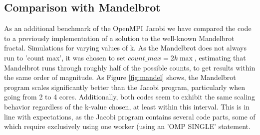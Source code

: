 \documentclass{article}
\begin{document}
\subsection{Comparison with Mandelbrot}
As an additional benchmark of the OpenMPI Jacobi we have compared the code to a previously implementation of a solution to the well-known Mandelbrot fractal. Simulations for varying values of k. As the Mandelbrot does not always run to 'count max', it was chosen to set $count\_max=2k\max$, estimating that Mandelbrot runs through roughly half of the possible counts, to get results within the same order of magnitude. As Figure \ref{fig:mandel} shows, the Mandelbrot program scales significantly better than the Jacobi program, particularly when going from 2 to 4 cores. Additionally, both codes seem to exhibit the same scaling behavior regardless of the k-value chosen, at least within this interval. This is in line with expectations, as the Jacobi program contains several code parts, some of which require exclusively using one worker (using an 'OMP SINGLE' statement.
\clearpage
\end{document}
